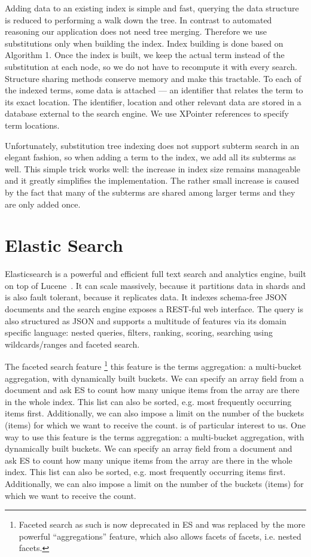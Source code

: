 \documentclass{deliverablereport}
\begin{document}
Adding data to an existing index is simple and fast, querying the data structure is
reduced to performing a walk down the tree. In contrast to automated reasoning our
application does not need tree merging. Therefore we use substitutions only when building
the index. Index building is done based on Algorithm 1. Once the index is built, we keep
the actual term instead of the substitution at each node, so we do not have to recompute
it with every search. Structure sharing methods conserve memory and make this
tractable. To each of the indexed terms, some data is attached — an identifier that
relates the term to its exact location. The identifier, location and other relevant data
are stored in a database external to the search engine. We use XPointer references to
specify term locations.

Unfortunately, substitution tree indexing does not support subterm search in an elegant
fashion, so when adding a term to the index, we add all its subterms as well. This simple
trick works well: the increase in index size remains manageable and it greatly simplifies
the implementation. The rather small increase is caused by the fact that many of the
subterms are shared among larger terms and they are only added once.

\section{Elastic Search}\label{sec:elastic}
Elasticsearch is a powerful and efficient full text search and analytics engine, built on
top of Lucene~\cite{Elastic}. It can scale massively, because it partitions data in shards and is also
fault tolerant, because it replicates data. It indexes schema-free JSON documents and the
search engine exposes a REST-ful web interface. The query is also structured as JSON and
supports a multitude of features via its domain specific language: nested queries,
filters, ranking, scoring, searching using wildcards/ranges and faceted search.

The faceted search feature \footnote{Faceted search as such is now deprecated in ES and
  was replaced by the more powerful “aggregations” feature, which also allows facets of
  facets, i.e. nested facets.} this feature is the terms aggregation: a multi-bucket
aggregation, with dynamically built buckets. We can specify an array field from a document
and ask ES to count how many unique items from the array are there in the whole
index. This list can also be sorted, e.g. most frequently occurring items
first. Additionally, we can also impose a limit on the number of the buckets (items) for
which we want to receive the count. is of particular interest to us. One way to use this
feature is the terms aggregation: a multi-bucket aggregation, with dynamically built
buckets. We can specify an array field from a document and ask ES to count how many unique
items from the array are there in the whole index. This list can also be sorted, e.g. most
frequently occurring items first. Additionally, we can also impose a limit on the number
of the buckets (items) for which we want to receive the count.
\end{document}

